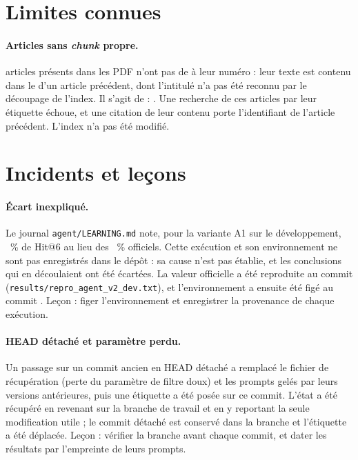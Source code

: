 \section{Limites connues}\label{sec:limites}

\paragraph{Articles sans \emph{chunk} propre.} \NCoverageMerged{} articles présents dans les PDF n'ont pas de
 à leur numéro : leur texte est contenu dans le  d'un article précédent, dont l'intitulé n'a pas
été reconnu par le découpage de l'index. Il s'agit de : \NCoverageMergedList. Une recherche de ces articles par leur
étiquette échoue, et une citation de leur contenu porte l'identifiant de l'article précédent. L'index n'a pas été
modifié.

\section{Incidents et leçons}\label{sec:incidents}

\paragraph{Écart inexpliqué.} Le journal \texttt{agent/LEARNING.md} note, pour la variante A1 sur le développement,
\EvEnvRun~\% de Hit@6 au lieu des \EvEnvOfficial~\% officiels. Cette exécution et son environnement ne sont pas enregistrés
dans le dépôt : sa cause n'est pas établie, et les conclusions qui en découlaient ont été écartées. La valeur officielle a été
reproduite au commit \texttt{\EvEnvReproCommit} (\texttt{results/repro\_agent\_v2\_dev.txt}), et l'environnement a ensuite été figé au
commit \texttt{\EvEnvPinCommit}. Leçon : figer l'environnement et enregistrer la provenance de chaque exécution.

\paragraph{HEAD détaché et paramètre perdu.} Un passage sur un commit ancien en HEAD détaché a remplacé le fichier de
récupération (perte du paramètre de filtre doux) et les prompts gelés par leurs versions antérieures, puis une étiquette
a été posée sur ce commit. L'état a été récupéré en revenant sur la branche de travail et en y reportant la seule
modification utile ; le commit détaché est conservé dans la branche \NGitRescue{} et l'étiquette a été déplacée.
Leçon : vérifier la branche avant chaque commit, et dater les résultats par l'empreinte de leurs prompts.


